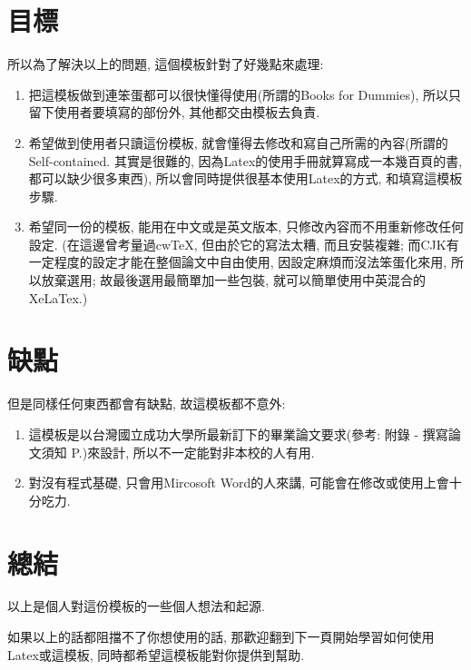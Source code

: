
\section{目標}
所以為了解決以上的問題, 這個模板針對了好幾點來處理:

\begin{enumerate}

  \item 把這模板做到連笨蛋都可以很快懂得使用(所謂的Books for Dummies), 所以只留下使用者要填寫的部份外, 其他都交由模板去負責.

  \item 希望做到使用者只讀這份模板, 就會懂得去修改和寫自己所需的內容(所謂的Self-contained. 其實是很難的, 因為Latex的使用手冊就算寫成一本幾百頁的書, 都可以缺少很多東西), 所以會同時提供很基本使用Latex的方式, 和填寫這模板步驟.

  \item 希望同一份的模板, 能用在中文或是英文版本, 只修改內容而不用重新修改任何設定. (在這邊曾考量過cwTeX, 但由於它的寫法太糟, 而且安裝複雜\cite{web:latex:cwtex}; 而CJK有一定程度的設定才能在整個論文中自由使用, 因設定麻煩而沒法笨蛋化來用, 所以放棄選用; 故最後選用最簡單加一些包裝, 就可以簡單使用中英混合的XeLaTex.)

\end{enumerate}


\section{缺點}
但是同樣任何東西都會有缺點, 故這模板都不意外:

\begin{enumerate}

  \item 這模板是以台灣國立成功大學所最新訂下的畢業論文要求(參考: 附錄 - 撰寫論文須知 P.\pageref{appendix:thesis-spec})來設計, 所以不一定能對非本校的人有用.

  \item 對沒有程式基礎, 只會用Mircosoft Word的人來講, 可能會在修改或使用上會十分吃力.

\end{enumerate}


\section{總結}

以上是個人對這份模板的一些個人想法和起源.

如果以上的話都阻擋不了你想使用的話, 那歡迎翻到下一頁開始學習如何使用Latex或這模板, 同時都希望這模板能對你提供到幫助.

\EndChapter
